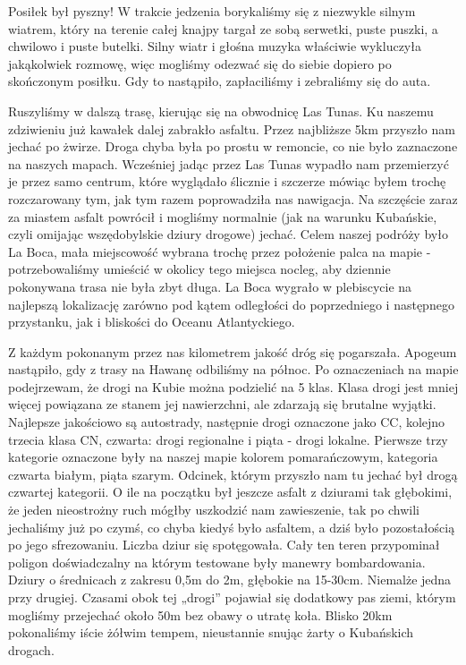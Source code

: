 Posiłek był pyszny!
W trakcie jedzenia borykaliśmy się z niezwykle silnym wiatrem, który na terenie całej knajpy targał ze sobą serwetki, puste puszki, a chwilowo i puste butelki.
Silny wiatr i głośna muzyka właściwie wykluczyła jakąkolwiek rozmowę, więc mogliśmy odezwać się do siebie dopiero po skończonym posiłku.
Gdy to nastąpiło, zapłaciliśmy i zebraliśmy się do auta.
\par Ruszyliśmy w dalszą trasę, kierując się na obwodnicę Las Tunas.
Ku naszemu zdziwieniu już kawałek dalej zabrakło asfaltu.
Przez najbliższe 5km przyszło nam jechać po żwirze.
Droga chyba była po prostu w remoncie, co nie było zaznaczone na naszych mapach.
Wcześniej jadąc przez Las Tunas wypadło nam przemierzyć je przez samo centrum, które wyglądało ślicznie i szczerze mówiąc byłem trochę rozczarowany tym, jak tym razem poprowadziła nas nawigacja.
Na szczęście zaraz za miastem asfalt powrócił i mogliśmy normalnie (jak na warunku Kubańskie, czyli omijając wszędobylskie dziury drogowe) jechać.
Celem naszej podróży było La Boca, mała miejscowość wybrana trochę przez położenie palca na mapie - potrzebowaliśmy umieścić w okolicy tego miejsca nocleg, aby dziennie pokonywana trasa nie była zbyt długa. La Boca wygrało w plebiscycie na najlepszą lokalizację zarówno pod kątem odległości do poprzedniego i następnego przystanku, jak i bliskości do Oceanu Atlantyckiego.
\par Z każdym pokonanym przez nas kilometrem jakość dróg się pogarszała.
Apogeum nastąpiło, gdy z trasy na Hawanę odbiliśmy na północ.
Po oznaczeniach na mapie podejrzewam, że drogi na Kubie można podzielić na 5 klas.
Klasa drogi jest mniej więcej powiązana ze stanem jej nawierzchni, ale zdarzają się brutalne wyjątki.
Najlepsze jakościowo są autostrady, następnie drogi oznaczone jako CC, kolejno trzecia klasa CN, czwarta: drogi regionalne i piąta - drogi lokalne.
Pierwsze trzy kategorie oznaczone były na naszej mapie kolorem pomarańczowym, kategoria czwarta białym, piąta szarym.
Odcinek, którym przyszło nam tu jechać był drogą czwartej kategorii.
O ile na początku był jeszcze asfalt z dziurami tak głębokimi, że jeden nieostrożny ruch mógłby uszkodzić nam zawieszenie, tak po chwili jechaliśmy już po czymś, co chyba kiedyś było asfaltem, a dziś było pozostałością po jego sfrezowaniu.
Liczba dziur się spotęgowała.
Cały ten teren przypominał poligon doświadczalny na którym testowane były manewry bombardowania.
Dziury o średnicach z zakresu 0,5m do 2m, głębokie na 15-30cm.
Niemalże jedna przy drugiej.
Czasami obok tej „drogi” pojawiał się dodatkowy pas ziemi, którym mogliśmy przejechać około 50m bez obawy o utratę koła.
Blisko 20km pokonaliśmy iście żółwim tempem, nieustannie snując żarty o Kubańskich drogach.

